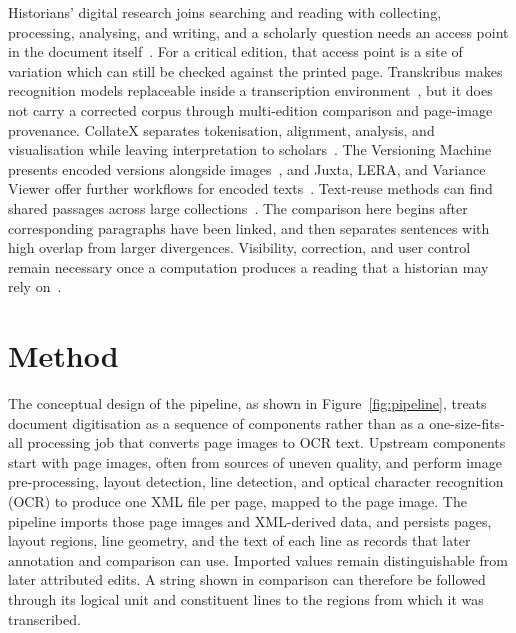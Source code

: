 \documentclass[sigconf,natbib,anonymous]{acmart}
\begin{document}
Historians' digital research joins searching and reading with collecting, processing, analysing, and writing, and a scholarly question needs an access point in the document itself~\cite{korkeamaki2019interacting,kumpulainen2020historical}.
For a critical edition, that access point is a site of variation which can still be checked against the printed page.
Transkribus makes recognition models replaceable inside a transcription environment~\cite{kahle2017transkribus}, but it does not carry a corrected corpus through multi-edition comparison and page-image provenance.
CollateX separates tokenisation, alignment, analysis, and visualisation while leaving interpretation to scholars~\cite{haentjensdekker2014collation}.
The Versioning Machine presents encoded versions alongside images~\cite{schreibman2003versioning}, and Juxta, LERA, and Variance Viewer offer further workflows for encoded texts~\cite{roeder2019collation}.
Text-reuse methods can find shared passages across large collections~\cite{smith2015reprinted}.
The comparison here begins after corresponding paragraphs have been linked, and then separates sentences with high overlap from larger divergences.
Visibility, correction, and user control remain necessary once a computation produces a reading that a historian may rely on~\cite{amershi2019guidelines}.

\section{Method}

The conceptual design of the pipeline, as shown in Figure~\ref{fig:pipeline}, treats document digitisation as a sequence of components rather than as a one-size-fits-all processing job that converts page images to OCR text.
Upstream components start with page images, often from sources of uneven quality, and perform image pre-processing, layout detection, line detection, and optical character recognition (OCR) to produce one XML file per page, mapped to the page image.
The pipeline imports those page images and XML-derived data, and persists pages, layout regions, line geometry, and the text of each line as records that later annotation and comparison can use.
Imported values remain distinguishable from later attributed edits.
A string shown in comparison can therefore be followed through its logical unit and constituent lines to the regions from which it was transcribed.
\end{document}
